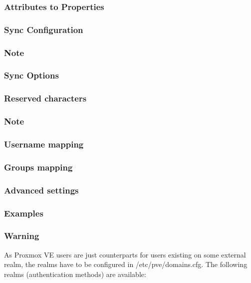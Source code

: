 \subsubsection{Attributes to Properties}

\subsubsection{Sync Configuration}

\subsubsection{Note}

\subsubsection{Sync Options}

\subsubsection{Reserved characters}

\subsubsection{Note}

\subsubsection{Username mapping}

\subsubsection{Groups mapping}

\subsubsection{Advanced settings}

\subsubsection{Examples}

\subsubsection{Warning}

As Proxmox VE users are just counterparts for users existing on some external realm, the realms have to be configured in /etc/pve/domains.cfg. The following realms (authentication methods) are available:

